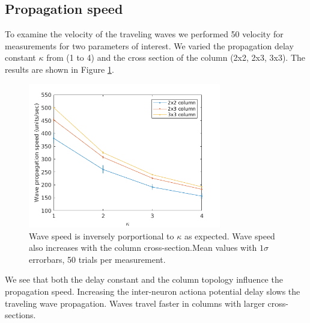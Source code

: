 \documentclass[a4paper,11pt]{article}
\begin{document}
\subsection{Propagation speed} \label{sub:propagation_speed}
To examine the velocity of the traveling waves we performed 50 velocity for measurements for two parameters of interest.
We varied the propagation delay constant $\kappa$ from (1 to 4) and the cross section of the column (2x2, 2x3, 3x3).
The results are shown in Figure \ref{fig:delay_topology}.
\begin{figure}[!htb]
 \caption{Wave speed is inversely porportional to $\kappa$ as expected. Wave speed also increases with the column cross-section.Mean values with $1\sigma$ errorbars, 50 trials per measurement.}
 \label{fig:delay_topology}
 \centering
   \includegraphics[width=0.75\textwidth]{fig/WaveSpeed_DelayTopology}
\end{figure}

We see that both the delay constant and the column topology influence the propagation speed.
Increasing the inter-neuron actiona potential delay slows the traveling wave propagation.
Waves travel faster in columns with larger cross-sections. 
\end{document}
